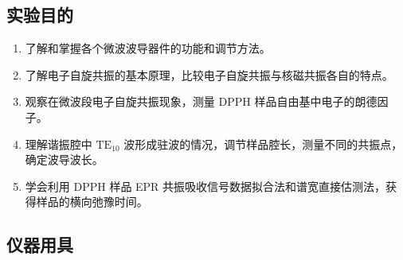 \documentclass[dvipsnames, svgnames,a4paper,11pt]{article}
\begin{document}
\subsection{实验目的}
\begin{enumerate}
	\item 了解和掌握各个微波波导器件的功能和调节方法。
	\item 了解电子自旋共振的基本原理，比较电子自旋共振与核磁共振各自的特点。
	\item 观察在微波段电子自旋共振现象，测量 DPPH 样品自由基中电子的朗德因子。
	\item 理解谐振腔中 $\mathrm{TE}_{10}$ 波形成驻波的情况，调节样品腔长，测量不同的共振点，确定波导波长。
	\item 学会利用 DPPH 样品 EPR 共振吸收信号数据拟合法和谱宽直接估测法，获得样品的横向弛豫时间。
	
\end{enumerate}

\subsection{仪器用具}


		
		
		




\end{document}
